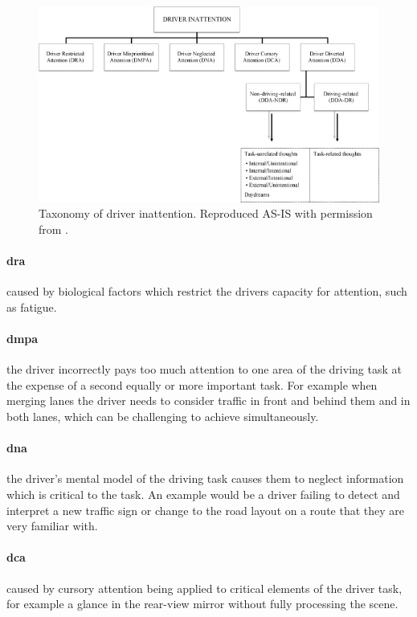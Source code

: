 \documentclass[11pt, parskip=half*,twoside=false]{scrbook}
\begin{document}
\begin{figure}[h]
	\centering
	\includegraphics[width=\textwidth]{driver_inattention_taxonomy} 
	\caption{Taxonomy of driver inattention. Reproduced AS-IS with permission from \citep{reganDriverDistractionDriver2011}.}
	\label{fig:taxonomy_inattention}
\end{figure}

\paragraph{\gls{dra}}caused by biological factors which restrict the drivers capacity for attention, such as fatigue. 

\paragraph{\gls{dmpa}} the driver incorrectly pays too much attention to one area of the driving task at the expense of a second equally or more important task. For example when merging lanes the driver needs to consider traffic in front and behind them and in both lanes, which can be challenging to achieve simultaneously.

\paragraph{\gls{dna}} the driver's mental model of the driving task causes them to neglect information which is critical to the task. An example would be a driver failing to detect and interpret a new traffic sign or change to the road layout on a route that they are very familiar with. 

\paragraph{\gls{dca}} caused by cursory attention being applied to critical elements of the driver task, for example a glance in the rear-view mirror without fully processing the scene. 
\end{document}

